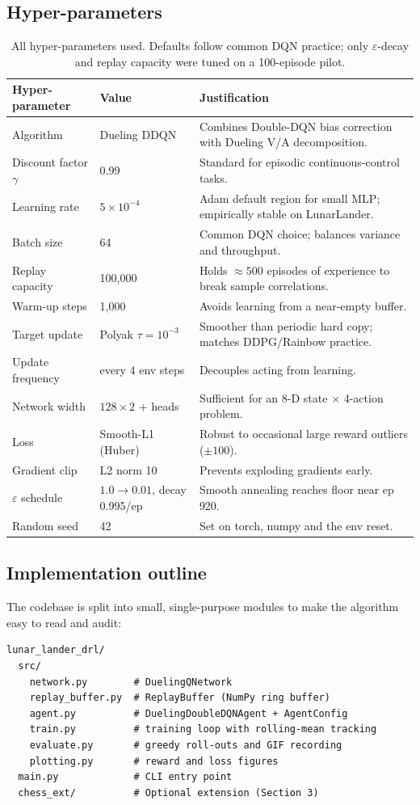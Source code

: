 \documentclass[11pt,a4paper]{article}
\begin{document}
\subsection{Hyper-parameters}
\begin{table}[h]
\centering\small
\caption{All hyper-parameters used. Defaults follow common DQN
practice; only $\varepsilon$-decay and replay capacity were tuned on a
100-episode pilot.}
\label{tab:hp}
\begin{tabular}{p{4cm}p{2.5cm}p{8cm}}
\toprule
\textbf{Hyper-parameter} & \textbf{Value} & \textbf{Justification} \\
\midrule
Algorithm & Dueling DDQN & Combines Double-DQN bias correction with Dueling V/A decomposition. \\
Discount factor $\gamma$ & 0.99 & Standard for episodic continuous-control tasks. \\
Learning rate & $5\!\times\!10^{-4}$ & Adam default region for small MLP; empirically stable on LunarLander. \\
Batch size & 64 & Common DQN choice; balances variance and throughput. \\
Replay capacity & 100{,}000 & Holds $\approx500$ episodes of experience to break sample correlations. \\
Warm-up steps & 1{,}000 & Avoids learning from a near-empty buffer. \\
Target update & Polyak $\tau\!=\!10^{-3}$ & Smoother than periodic hard copy; matches DDPG/Rainbow practice. \\
Update frequency & every 4 env steps & Decouples acting from learning. \\
Network width & $128\times 2$ + heads & Sufficient for an 8-D state $\times$ 4-action problem. \\
Loss & Smooth-L1 (Huber) & Robust to occasional large reward outliers ($\pm100$). \\
Gradient clip & L2 norm 10 & Prevents exploding gradients early. \\
$\varepsilon$ schedule & $1.0\!\to\!0.01$, decay 0.995/ep & Smooth annealing reaches floor near ep 920. \\
Random seed & 42 & Set on torch, numpy and the env reset. \\
\bottomrule
\end{tabular}
\end{table}

\subsection{Implementation outline}
The codebase is split into small, single-purpose modules to make the
algorithm easy to read and audit:
\begin{lstlisting}
lunar_lander_drl/
  src/
    network.py        # DuelingQNetwork
    replay_buffer.py  # ReplayBuffer (NumPy ring buffer)
    agent.py          # DuelingDoubleDQNAgent + AgentConfig
    train.py          # training loop with rolling-mean tracking
    evaluate.py       # greedy roll-outs and GIF recording
    plotting.py       # reward and loss figures
  main.py             # CLI entry point
  chess_ext/          # Optional extension (Section 3)
\end{lstlisting}
\end{document}
